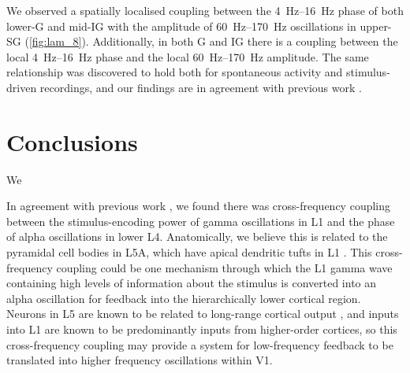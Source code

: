 We observed a spatially localised coupling between the \SIrange{4}{16}{Hz} phase of both lower-\ac{G} and mid-\ac{IG} with the amplitude of \SIrange{60}{170}{Hz} oscillations in upper-\ac{SG} (\autoref{fig:lam_8}).
Additionally, in both \ac{G} and \ac{IG} there is a coupling between the local \SIrange{4}{16}{Hz} phase and the local \SIrange{60}{170}{Hz} amplitude.
The same relationship was discovered to hold both for spontaneous activity and stimulus-driven recordings, and our findings are in agreement with previous work \citep{Spaak2012}.


\section{Conclusions}

We

In agreement with previous work \citep{Spaak2012}, we found there was cross-frequency coupling between the stimulus-encoding power of gamma oscillations in \ac{L1} and the phase of alpha oscillations in lower \ac{L4}.
Anatomically, we believe this is related to the pyramidal cell bodies in \ac{L5A}, which have apical dendritic tufts in \ac{L1} \citep{Hill2013,Zhu2004}.
This cross-frequency coupling could be one mechanism through which the \ac{L1} gamma wave containing high levels of information about the stimulus is converted into an alpha oscillation for feedback into the hierarchically lower cortical region.
Neurons in \ac{L5} are known to be related to long-range cortical output \citep{Hill2013}, and inputs into \ac{L1} are known to be predominantly inputs from higher-order cortices, so this cross-frequency coupling may provide a system for low-frequency feedback to be translated into higher frequency oscillations within \ac{V1}.
